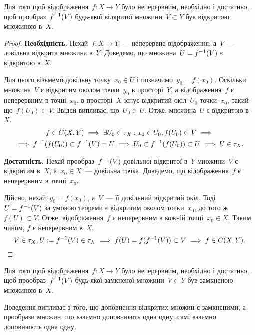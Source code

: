 \begin{theorem}
    Для того щоб відображення~$f: X \to Y$ було неперервним, необхідно і достатньо, щоб прообраз~$f^{-1}(V)$ будь-якої відкритої множини~$V \subset Y$ був відкритою множиною в~$X$.
\end{theorem}

\begin{proof}
    \textbf{Необхідність.} Нехай~$f: X \to Y$~--- неперервне відображення, а~$V$~--- довільна відкрита множина в~$Y$. Доведемо, що множина~$U = f^{-1}(V)$ є відкритою в~$X$.

    Для цього візьмемо довільну точку~$x_0 \in U$ і позначимо~$y_0 = f(x_0)$. Оскільки множина~$V$ є відкритим околом точки~$y_0$ в просторі~$Y$, а відображення~$f$ є неперервним в точці~$x_0$, в просторі~$X$ існує відкритий окіл~$U_0$ точки~$x_0$, такий що~$f(U_0) \subset V$. Звідси випливає, що~$U_0 \subset U$. Отже, множина~$U$ є відкритою в~$X$.
    \begin{multline*}
        f \in C(X, Y) \implies \exists U_0 \in \tau_X: x_0 \in U_0, f(U_0) \subset V \implies \\
        \implies f^{-1}(f(U_0)) \subset f^{-1}(V) = U \implies U_0 \subset f^{-1}(f(U_0)) \subset U \implies U \in \tau_X.
    \end{multline*}

    \textbf{Достатність.} Нехай прообраз~$f^{-1}(V)$ довільної відкритої в~$Y$ множини~$V$ є відкритим в~$X$, а~$x_0 \in X$~--- довільна точка. Доведемо, що відображення~$f$ є неперервним в точці~$x_0$.

    Дійсно, нехай~$y_0 = f(x_0)$, а~$V$~--- її довільний відкритий окіл. Тоді~$U = f^{-1}(V)$ за умовою теореми є відкритим околом точки~$x_0$, до того ж~$f(U) \subset V$. Отже, відображення~$f$ є неперервним в кожній точці~$x_0 \in X$. Таким чином, $f$ є неперервним в~$X$.
    \begin{equation*}
        V \in \tau_X, U := f^{-1}(V) \in \tau_X \implies f(U) = f(f^{-1}(V)) \subset V \implies f \in C(X, Y). \qedhere
    \end{equation*}
\end{proof}

\begin{theorem}
    Для того щоб відображення~$f: X \to Y$ було неперервним, необхідно і достатньо, щоб прообраз~$f^{-1}(V)$ будь-якої замкненої множини~$V \subset Y$ був замкненою множиною в~$X$.
\end{theorem}

Доведення випливає з того, що доповнення відкритих множин є замкненими, а прообрази множин, що взаємно доповнюють одна одну, самі взаємно доповнюють одна одну.

